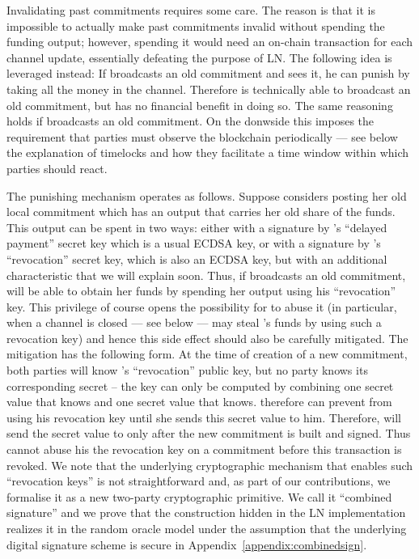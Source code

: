     Invalidating past commitments requires some care. The reason is that it is
    impossible to actually make past commitments invalid without spending the
    funding output; however, spending it would need an on-chain transaction for
    each channel update, essentially defeating the purpose of LN. The following
    idea is leveraged instead: If \alice{} broadcasts an old commitment and
    \bob{} sees it, he can punish \alice{} by taking all the money in the
    channel. Therefore \alice{} is technically able to broadcast an old
    commitment, but has no financial benefit in doing so. The same reasoning
    holds if \bob{} broadcasts an old commitment. On the donwside this imposes
    the requirement that parties must observe the blockchain periodically ---
    see below the explanation of timelocks and how they facilitate a time window
    within which parties should react.

    The punishing mechanism operates as follows. Suppose \alice{} considers
    posting her old local commitment which has an output that carries her old
    share of the funds. This output can be spent in two ways: either with a
    signature by \alice's ``delayed payment'' secret key which is a usual ECDSA
    key, or with a signature by \bob's ``revocation'' secret key, which is also
    an ECDSA key, but with an additional characteristic that we will explain
    soon. Thus, if \alice{} broadcasts an old commitment, \bob{} will be able to
    obtain her funds by spending her output using his ``revocation'' key. This
    privilege of course opens the possibility for \bob{} to abuse it (in
    particular, when a channel is closed --- see below --- \bob{} may steal
    \alice's funds by using such a revocation key) and hence this side effect
    should also be carefully mitigated. The mitigation has the following form.
    At the time of creation of a new commitment, both parties will know \bob's
    ``revocation'' public key, but no party knows its corresponding secret --
    the key can only be computed by combining one secret value that \alice{}
    knows and one secret value that \bob{} knows. \alice{} therefore can prevent
    \bob{} from using his revocation key until she  sends this secret value to
    him. Therefore, \alice{} will send the secret value to \bob{} only after the
    new commitment is built and signed. Thus \bob{} cannot abuse his the
    revocation key on a commitment before this transaction is revoked. We note
    that the underlying cryptographic mechanism  that enables such ``revocation
    keys'' is not straightforward and, as part of our contributions, we
    formalise it as a new two-party cryptographic primitive. We call it
    ``combined signature'' and we prove that the construction hidden in the LN
    implementation realizes it in the random oracle model under the assumption
    that the underlying digital signature scheme is secure in
    Appendix~\ref{appendix:combinedsign}.

